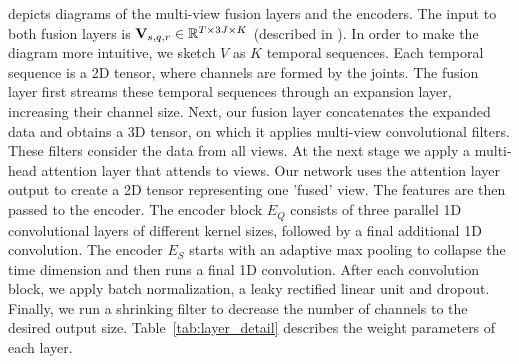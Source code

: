  depicts diagrams of the multi-view fusion layers and the encoders. The input to both fusion layers is ${\bf V}_{s,q,r}\in\mathbb{R}^{T\times 3J\times K}$ (described in )\fi. 
In order to make the diagram more intuitive, we sketch $V$ as $K$ temporal sequences. 
Each temporal sequence is a 2D tensor, where channels are formed by the joints.
The fusion layer first streams these temporal sequences through an expansion layer, increasing their channel size. 
Next, our fusion layer concatenates the expanded data and obtains a 3D tensor, on which it applies multi-view convolutional filters. These filters consider the data from all views. At the next stage we apply a multi-head attention layer that attends to views. Our network uses the attention layer output to create a 2D tensor representing one 'fused' view. The features are then passed to the encoder. 
The encoder block $E_Q$ consists of three parallel 1D convolutional layers of different kernel sizes, followed by a final additional 1D convolution. The encoder $E_S$ starts with an adaptive max pooling to collapse the time dimension and then runs a final 1D convolution.
After each convolution block, we apply batch normalization, a leaky rectified linear unit and dropout. 
Finally, we run a shrinking filter to decrease the number of channels to the desired output size. 
Table~\ref{tab:layer_detail} describes the weight parameters of each layer.





